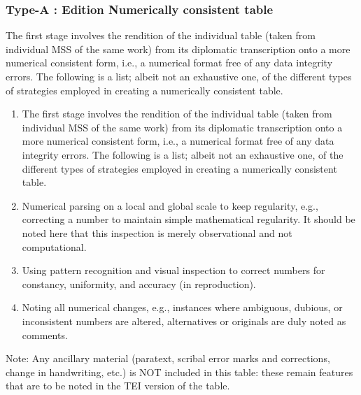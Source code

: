 \documentclass[a4paper,12pt,twoside]{book}
\begin{document}
				\subsubsection{Type-A : Edition Numerically consistent table}
	The first stage involves the rendition of the individual table (taken from individual MSS of the same work) from its diplomatic transcription onto a more numerical consistent form, i.e., a numerical format free of any data integrity errors. The following is a list; albeit not an exhaustive one, of the different types of strategies employed in creating a numerically consistent table.
	\begin{enumerate}
		\item The first stage involves the rendition of the individual table (taken from individual MSS of the same work) from its diplomatic transcription onto a more numerical consistent form, i.e., a numerical format free of any data integrity errors. The following is a list; albeit not an exhaustive one, of the different types of strategies employed in creating a numerically consistent table.
		\item Numerical parsing on a local and global scale to keep regularity, e.g., correcting a number to maintain simple mathematical regularity. It should be noted here that this inspection is merely observational and not computational.
		\item Using pattern recognition and visual inspection to correct numbers for constancy, uniformity, and accuracy (in reproduction).
		\item Noting all numerical changes, e.g., instances where ambiguous, dubious, or inconsistent numbers are altered, alternatives or originals are duly noted as comments.
	\end{enumerate}
	Note: Any ancillary material (paratext, scribal error marks and corrections, change in handwriting, etc.) is NOT included in this table: these remain features that are to be noted in the TEI version of the table.
	
\end{document}
